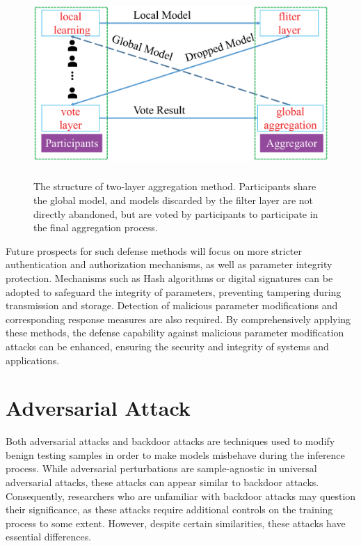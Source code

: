 \documentclass[pdflatex,sn-mathphys-num]{sn-jnl}%
\theoremstyle{thmstyleone}%
\theoremstyle{thmstyletwo}%
\theoremstyle{thmstylethree}%
\begin{document}
\begin{figure}[h]
	\centering
	\includegraphics[width=1.0\linewidth,height=2.8in]{output/fig19.eps}
	\caption{The structure of two-layer aggregation method. Participants
		share the global model, and models discarded by the filter layer are
		not directly abandoned, but are voted by participants to participate
		in the final aggregation process.}
	\label{fig19}
\end{figure}


Future prospects for such defense methods will
focus on more stricter authentication and authorization
mechanisms, as well as parameter integrity protection.
Mechanisms such as Hash algorithms or digital signatures
can be adopted to safeguard the integrity of parameters,
preventing tampering during transmission and storage.
Detection of malicious parameter modifications and
corresponding response measures are also required.
By comprehensively applying these methods, the defense capability
against malicious parameter modification attacks can be
enhanced, ensuring the security and integrity of systems
and applications.


\section{Adversarial Attack}
Both adversarial attacks and backdoor attacks are techniques used to modify benign testing samples in order
to make models misbehave during the inference process. While adversarial perturbations are sample-agnostic in
universal adversarial attacks, these attacks can appear similar to backdoor attacks. Consequently, researchers
who are unfamiliar with backdoor attacks may question their significance, as these attacks require additional
controls on the training process to some extent. However, despite certain similarities, these attacks have essential
differences.
\end{document}
